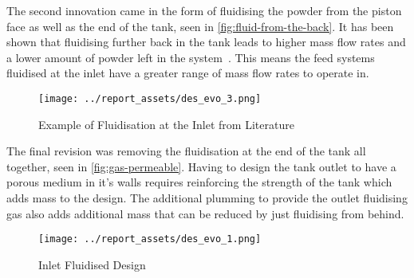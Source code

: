 The second innovation came in the form of fluidising the powder from the piston face as well as the end of the tank, seen in \autoref{fig:fluid-from-the-back}. It has been shown that fluidising further back in the tank leads to higher mass flow rates and a lower amount of powder left in the system~\cite{Tang22}. This means the feed systems fluidised at the inlet have a greater range of mass flow rates to operate in.
\begin{figure}[htbp]
    \centering
    
    \begin{minipage}{0.9\textwidth}
        \centering
        \texttt{[image: ../report\_assets/des\_evo\_3.png]}
        \caption{Example of Fluidisation at the Inlet from Literature~\cite{NASA2008_20080002287}}\label{fig:fluid-from-the-back}
    \end{minipage}
   
\end{figure}

The final revision was removing the fluidisation at the end of the tank all together, seen in \autoref{fig:gas-permeable}. Having to design the tank outlet to have a porous medium in it's walls requires reinforcing the strength of the tank which adds mass to the design. The additional plumming to provide the outlet fluidising gas also adds additional mass that can be reduced by just fluidising from behind.
\begin{figure}[htbp]
    \centering
    
    \begin{minipage}{0.8\textwidth}
        \centering
        \texttt{[image: ../report\_assets/des\_evo\_1.png]}
        \caption{Inlet Fluidised Design~\cite{TANG2023118406}}\label{fig:gas-permeable}
    \end{minipage}
   
\end{figure}

